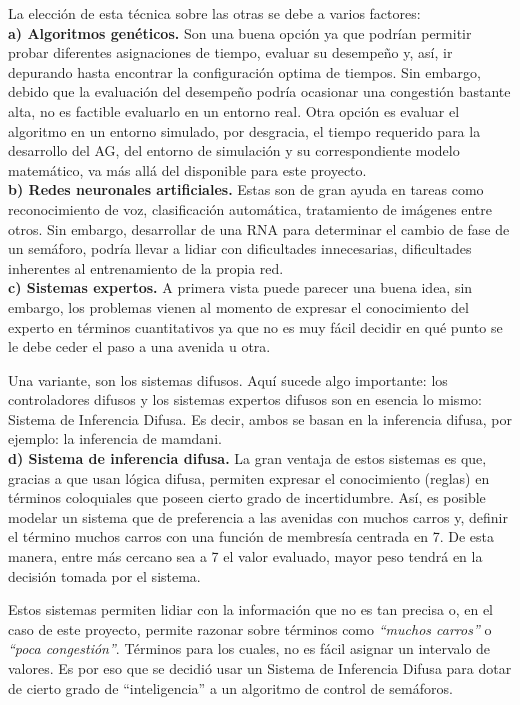 La elección de esta técnica sobre las otras se debe a varios factores:\\

\textbf{a) Algoritmos genéticos.} Son una buena opción ya que podrían permitir probar diferentes asignaciones de tiempo, evaluar su desempeño y, así, ir depurando hasta encontrar la configuración optima de tiempos. Sin embargo, debido que la evaluación del desempeño podría ocasionar una congestión bastante alta, no es factible evaluarlo en un entorno real. Otra opción es evaluar el algoritmo en un entorno simulado, por desgracia, el tiempo requerido para la desarrollo del AG, del entorno de simulación y su correspondiente modelo matemático, va más allá del disponible para este proyecto.\\

\textbf{b) Redes neuronales artificiales.} Estas son de gran ayuda en tareas como reconocimiento de voz, clasificación automática, tratamiento de imágenes entre otros. Sin embargo, desarrollar de una RNA para determinar el cambio de fase de un semáforo, podría llevar a lidiar con dificultades innecesarias, dificultades inherentes al entrenamiento de la propia red.\\

\textbf{c) Sistemas expertos.} A primera vista puede parecer una buena idea, sin embargo, los problemas vienen al momento de expresar el conocimiento del experto en términos cuantitativos ya que no es muy fácil decidir en qué punto se le debe ceder el paso a una avenida u otra.

Una variante, son los sistemas difusos. Aquí sucede algo importante: los controladores difusos y los sistemas expertos difusos son en esencia lo mismo: Sistema de Inferencia Difusa. Es decir, ambos se basan en la inferencia difusa, por ejemplo: la inferencia de mamdani.\\

\textbf{d) Sistema de inferencia difusa.} La gran ventaja de estos sistemas es que, gracias a que usan lógica difusa, permiten expresar el conocimiento (reglas) en términos coloquiales que poseen cierto grado de incertidumbre. Así, es posible modelar un sistema que de preferencia a las avenidas con muchos carros y, definir el término muchos carros con una función de membresía centrada en 7. De esta manera, entre más cercano sea a 7 el valor evaluado, mayor peso tendrá en la decisión tomada por el sistema.

Estos sistemas permiten lidiar con la información que no es tan precisa o, en el caso de este proyecto, permite razonar sobre términos como \textit{``muchos carros''} o \textit{``poca congestión''}. Términos para los cuales, no es fácil asignar un intervalo de valores. Es por eso que se decidió usar un Sistema de Inferencia Difusa para dotar de cierto grado de ``inteligencia'' a un algoritmo de control de semáforos.\\

